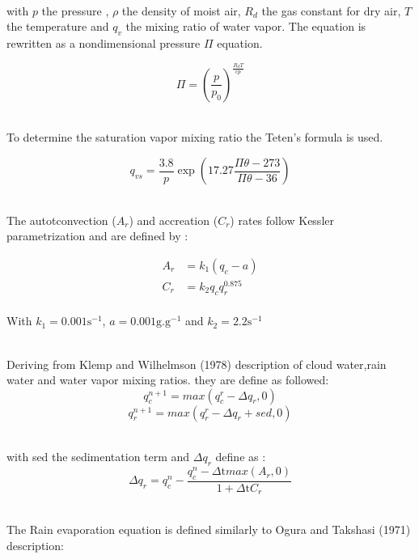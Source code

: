 \documentclass[times,doublespace]{fldauth}
\begin{document}
~\\ with $p$ the pressure , $\rho$ the density of moist air, $R_d$ the gas constant for dry air, $T$ the temperature and $q_v$ the mixing ratio of water vapor. The equation is rewritten as a nondimensional pressure $\Pi$ equation.

\begin{equation}
\Pi=\left(\frac{p}{p_0}\right)^{\frac{R_dT}{cp}}
\end{equation}


~\\To determine the saturation vapor mixing ratio the Teten's formula is used.

\begin{equation}
q_{vs}=\frac{3.8}{p}\exp\left(17.27\frac{\Pi \theta-273}{\Pi \theta-36}\right)
\end {equation}



~\\The autotconvection ($A_r$) and accreation ($C_r$) rates follow Kessler parametrization and are defined by :

\begin{equation}
\begin{split}
A_r&=k_1(q_c-a) \\
C_r&=k_2q_cq_r^{0.875}
\end{split}
\end{equation}
~\\ With $k_1=0.001 \text{s}^{-1}$, $a=0.001 \text{g}.\text{g}^{-1}$ and $k_2=2.2 \text{s}^{-1}$ 

~\\ Deriving from Klemp and Wilhelmson (1978) description of cloud water,rain water and water vapor mixing ratios. they are define as followed:
\begin{equation}
q_c^{n+1}=max(q_c^r-\Delta q_r,0)
\end{equation}
\begin{equation}
q_r^{n+1}=max(q_r^r-\Delta q_r+sed,0)
\end{equation}

~\\with sed the sedimentation term and $\Delta q_r$ define as :
\begin{equation}
\Delta q_r=q_c^n-\frac{q_c^n-\Delta \text{t} max(A_r,0)}{1+\Delta \text{t} C_r}
\end{equation}






~\\ The Rain evaporation equation is defined similarly to Ogura and Takshasi (1971) description:
\end{document}
